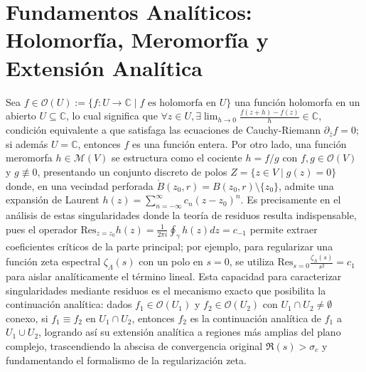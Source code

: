 \documentclass[12pt,a4paper]{article}
\begin{document}
\section*{Fundamentos Analíticos: Holomorfía, Meromorfía y Extensión Analítica}
Sea $f \in \mathcal{O}(U) := \{ f: U \to \mathbb{C} \mid f \text{ es holomorfa en } U \}$ una función holomorfa en un abierto $U \subseteq \mathbb{C}$, lo cual significa que $\forall z \in U, \exists \lim_{h \to 0} \frac{f(z+h)-f(z)}{h} \in \mathbb{C}$, condición equivalente a que satisfaga las ecuaciones de Cauchy-Riemann $\partial_{\bar{z}}f = 0$; si además $U = \mathbb{C}$, entonces $f$ es una función entera. Por otro lado, una función meromorfa $h \in \mathcal{M}(V)$ se estructura como el cociente $h = f/g$ con $f, g \in \mathcal{O}(V)$ y $g \not\equiv 0$, presentando un conjunto discreto de polos $Z = \{z \in V \mid g(z) = 0\}$ donde, en una vecindad perforada $\mathring{B}(z_0, r) = B(z_0, r) \setminus \{z_0\}$, admite una expansión de Laurent $h(z) = \sum_{n=-\infty}^{\infty} c_n (z-z_0)^n$. Es precisamente en el análisis de estas singularidades donde la teoría de residuos resulta indispensable, pues el operador $\text{Res}_{z=z_0} h(z) = \frac{1}{2\pi i} \oint_{\gamma} h(z)dz = c_{-1}$ permite extraer coeficientes críticos de la parte principal; por ejemplo, para regularizar una función zeta espectral $\zeta_\Lambda(s)$ con un polo en $s=0$, se utiliza $\text{Res}_{s=0} \frac{\zeta_\Lambda(s)}{s^2} = c_1$ para aislar analíticamente el término lineal. Esta capacidad para caracterizar singularidades mediante residuos es el mecanismo exacto que posibilita la continuación analítica: dados $f_1 \in \mathcal{O}(U_1)$ y $f_2 \in \mathcal{O}(U_2)$ con $U_1 \cap U_2 \neq \emptyset$ conexo, si $f_1 \equiv f_2$ en $U_1 \cap U_2$, entonces $f_2$ es la continuación analítica de $f_1$ a $U_1 \cup U_2$, logrando así su extensión analítica a regiones más amplias del plano complejo, trascendiendo la abscisa de convergencia original $\Re(s) > \sigma_c$ y fundamentando el formalismo de la regularización zeta.
\end{document}
